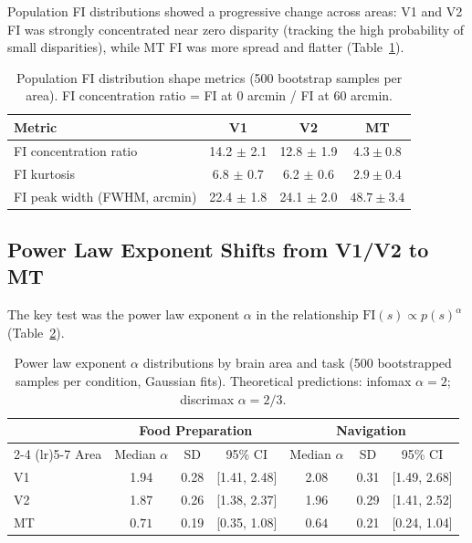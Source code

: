 \documentclass[11pt]{article}
\begin{document}
Population FI distributions showed a progressive change across areas: V1 and V2 FI was strongly concentrated near zero disparity (tracking the high probability of small disparities), while MT FI was more spread and flatter (Table~\ref{tab:fi_shape}).

\begin{table}[H]
\centering
\caption{Population FI distribution shape metrics (500 bootstrap samples per area). FI concentration ratio = FI at 0 arcmin / FI at 60 arcmin.}
\label{tab:fi_shape}
\begin{tabular}{lccc}
\toprule
Metric & V1 & V2 & MT \\
\midrule
FI concentration ratio & 14.2 $\pm$ 2.1 & 12.8 $\pm$ 1.9 & $\mathbf{4.3 \pm 0.8}$ \\
FI kurtosis & 6.8 $\pm$ 0.7 & 6.2 $\pm$ 0.6 & $\mathbf{2.9 \pm 0.4}$ \\
FI peak width (FWHM, arcmin) & 22.4 $\pm$ 1.8 & 24.1 $\pm$ 2.0 & $\mathbf{48.7 \pm 3.4}$ \\
\bottomrule
\end{tabular}
\end{table}

\subsection{Power Law Exponent Shifts from V1/V2 to MT}

The key test was the power law exponent $\alpha$ in the relationship $\text{FI}(s) \propto p(s)^{\alpha}$ (Table~\ref{tab:alpha}).

\begin{table}[H]
\centering
\caption{Power law exponent $\alpha$ distributions by brain area and task (500 bootstrapped samples per condition, Gaussian fits). Theoretical predictions: infomax $\alpha = 2$; discrimax $\alpha = 2/3$.}
\label{tab:alpha}
\begin{tabular}{lcccccc}
\toprule
 & \multicolumn{3}{c}{Food Preparation} & \multicolumn{3}{c}{Navigation} \\
\cmidrule(lr){2-4} \cmidrule(lr){5-7}
Area & Median $\alpha$ & SD & 95\% CI & Median $\alpha$ & SD & 95\% CI \\
\midrule
V1 & 1.94 & 0.28 & [1.41, 2.48] & 2.08 & 0.31 & [1.49, 2.68] \\
V2 & 1.87 & 0.26 & [1.38, 2.37] & 1.96 & 0.29 & [1.41, 2.52] \\
MT & $\mathbf{0.71}$ & 0.19 & [0.35, 1.08] & $\mathbf{0.64}$ & 0.21 & [0.24, 1.04] \\
\bottomrule
\end{tabular}
\end{table}
\end{document}
